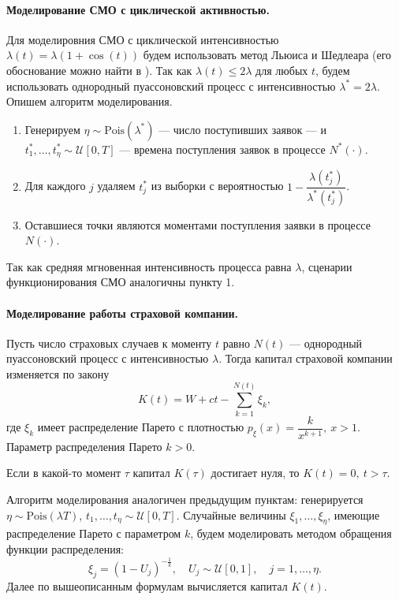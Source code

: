 \documentclass[16pt]{article}
\begin{document}
\paragraph{Моделирование СМО с циклической активностью.}
Для моделировния СМО с циклической интенсивностью $\lambda(t) = \lambda(1 + \cos(t))$ будем использовать метод Льюиса и Шедлеара (его обоснование можно найти в \cite{Lewis}). Так как $\lambda(t) \leq 2\lambda$ для любых $t$, будем использовать однородный пуассоновский процесс с интенсивностью $\lambda^* = 2 \lambda$. Опишем алгоритм моделирования.

\begin{enumerate}
	\item Генерируем $\eta \sim \mathrm{Pois}(\lambda^*)$ --- число поступивших заявок --- и $t_1^*, \ldots, t_\eta^* \sim \mathcal{U}[0, T]$ --- времена поступления заявок в процессе $N^*(\cdot)$.
	\item Для каждого $j$ удаляем $t_j^*$ из выборки с вероятностью $1 - \dfrac{\lambda(t_j^*)}{\lambda^*(t_j^*)}$.
	\item Оставшиеся точки являются моментами поступления заявки в процессе $N(\cdot)$.
\end{enumerate}

Так как средняя мгновенная интенсивность процесса равна $\lambda$, сценарии функционирования СМО аналогичны пункту 1.

\paragraph{Моделирование работы страховой компании.}
Пусть число страховых случаев к моменту $t$ равно $N(t)$ --- однородный пуассоновский процесс с интенсивностью $\lambda$. Тогда капитал страховой компании изменяется по закону
$$K(t) = W + ct - \sum_{k=1}^{N(t)}\xi_k,$$
где $\xi_k$ имеет распределение Парето с плотностью $p_\xi(x) = \dfrac{k}{x^{k+1}}, \ x > 1$. Параметр распределения Парето $k > 0$.

Если в какой-то момент $\tau$ капитал $K(\tau)$ достигает нуля, то $K(t) = 0, \ t > \tau$.

Алгоритм моделирования аналогичен предыдущим пунктам: генерируется $\eta \sim \mathrm{Pois}(\lambda T)$,
$t_1, \ldots, t_\eta \sim \mathcal{U}[0, T]$. Случайные величины $\xi_1, \ldots, \xi_\eta$, имеющие распределение Парето с параметром $k$, будем моделировать методом обращения функции распределения:
$$\xi_j = (1 - U_j)^{-\frac{1}{k}}, \quad U_j \sim \mathcal{U}[0, 1], \quad j = 1, \ldots, \eta.$$
Далее по вышеописанным формулам вычисляется капитал $K(t)$.
\end{document}
